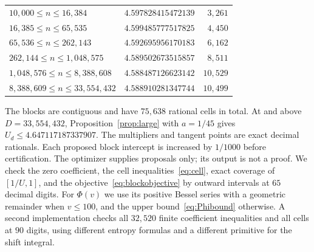 \documentclass[11pt]{amsart}
\theoremstyle{definition}
\theoremstyle{remark}
\begin{document}
\begin{center}
\begin{tabular}{@{}lrr@{}}
$10{,}000\le n\le 16{,}384$ & $4.597828415472139$ & $3{,}261$ \\
$16{,}385\le n\le 65{,}535$ & $4.599485777517825$ & $4{,}450$ \\
$65{,}536\le n\le 262{,}143$ & $4.592695956170183$ & $6{,}162$ \\
$262{,}144\le n\le 1{,}048{,}575$ & $4.589502673515857$ & $8{,}511$ \\
$1{,}048{,}576\le n\le 8{,}388{,}608$ & $4.588487126623142$ & $10{,}529$ \\
$8{,}388{,}609\le n\le 33{,}554{,}432$ & $4.588910281347744$ & $10{,}499$ \\
\bottomrule
\end{tabular}
\end{center}
The blocks are contiguous and have $75{,}638$ rational cells in total. At and above $D=33{,}554{,}432$, Proposition~\ref{prop:large} with $a=1/45$ gives $U_d\le4.647117187337907$. The multipliers and tangent points are exact decimal rationals. Each proposed block intercept is increased by $1/1000$ before certification. The optimizer supplies proposals only; its output is not a proof. We check the zero coefficient, the cell inequalities~\eqref{eq:cell}, exact coverage of $[1/U,1]$, and the objective~\eqref{eq:blockobjective} by outward intervals at $65$ decimal digits. For $\Phi(v)$ we use its positive Bessel series with a geometric remainder when $v\le100$, and the upper bound~\eqref{eq:Phibound} otherwise. A second implementation checks all $32{,}520$ finite coefficient inequalities and all cells at $90$ digits, using different entropy formulas and a different primitive for the shift integral.
\end{document}
